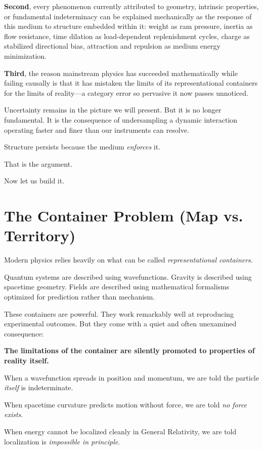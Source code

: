 \documentclass[12pt, a4paper]{article}
\begin{document}
\textbf{Second}, every phenomenon currently attributed to geometry, intrinsic properties, or fundamental indeterminacy can be explained mechanically as the response of this medium to structure embedded within it: weight as ram pressure, inertia as flow resistance, time dilation as load-dependent replenishment cycles, charge as stabilized directional bias, attraction and repulsion as medium energy minimization.

\textbf{Third}, the reason mainstream physics has succeeded mathematically while failing causally is that it has mistaken the limits of its representational containers for the limits of reality—a category error so pervasive it now passes unnoticed.

Uncertainty remains in the picture we will present. But it is no longer fundamental. It is the consequence of undersampling a dynamic interaction operating faster and finer than our instruments can resolve.

Structure persists because the medium \textit{enforces} it.

That is the argument.

Now let us build it.

\section{The Container Problem (Map vs. Territory)}
\label{sec:container}

Modern physics relies heavily on what can be called \textit{representational containers}.

Quantum systems are described using wavefunctions. Gravity is described using spacetime geometry. Fields are described using mathematical formalisms optimized for prediction rather than mechanism.

These containers are powerful. They work remarkably well at reproducing experimental outcomes. But they come with a quiet and often unexamined consequence:

\textbf{The limitations of the container are silently promoted to properties of reality itself.}

When a wavefunction spreads in position and momentum, we are told the particle \textit{itself} is indeterminate.

When spacetime curvature predicts motion without force, we are told \textit{no force exists}.

When energy cannot be localized cleanly in General Relativity, we are told localization is \textit{impossible in principle}.
\end{document}
